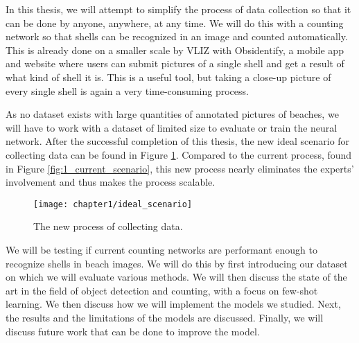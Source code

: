 In this thesis, we will attempt to simplify the process of data collection so that it can be done by anyone, anywhere, at any time. We will do this with a counting network so that shells can be recognized in an image and counted automatically. This is already done on a smaller scale by VLIZ with Obsidentify, a mobile app and website where users can submit pictures of a single shell and get a result of what kind of shell it is. This is a useful tool, but taking a close-up picture of every single shell is again a very time-consuming process. 

As no dataset exists with large quantities of annotated pictures of beaches, we will have to work with a dataset of limited size to evaluate or train the neural network. After the successful completion of this thesis, the new ideal scenario for collecting data can be found in Figure \ref{fig:1_ideal_scenario}. Compared to the current process, found in Figure \ref{fig:1_current_scenario}, this new process nearly eliminates the experts' involvement and thus makes the process scalable.

\begin{figure}[h]
	\centering
	\texttt{[image: chapter1/ideal\_scenario]}
	\caption{The new process of collecting data.}
	\label{fig:1_ideal_scenario}
\end{figure}

We will be testing if current counting networks are performant enough to recognize shells in beach images. We will do this by first introducing our dataset on which we will evaluate various methods. We will then discuss the state of the art in the field of object detection and counting, with a focus on few-shot learning. We then discuss how we will implement the models we studied. Next, the results and the limitations of the models are discussed. Finally, we will discuss future work that can be done to improve the model.